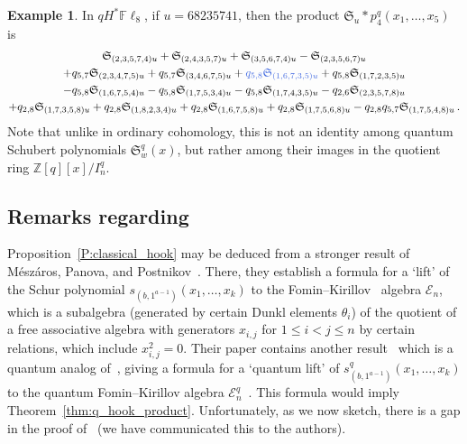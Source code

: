 \documentclass[12pt,oneside,reqno]{amsart}
\theoremstyle{definition}
\newtheorem{example}[theorem]{Example}
\numberwithin{equation}{section}
\newcommand{\Fl}{{\mathbb F}\ell}
\newcommand{\ZZ}{{\mathbb Z}}
\newcommand{\frakS}{{\mathfrak S}}
\newcommand{\defcolor}[1]{{\color{RoyalBlue}#1}}
\begin{document}
\begin{example}\label{Ex:MN_example}
In $qH^*\Fl_8$, if $u=68235741$, then the product $\frakS_{u}\ast p^q_4(x_1,\dotsc,x_5)$ is
\begin{gather*}
      \frakS_{(2,3,5,7,4)u}
    + \frakS_{(2,4,3,5,7)u}
    + \frakS_{(3,5,6,7,4)u}
    - \frakS_{(2,3,5,6,7)u}
    \\
    + q_{5,7}\frakS_{(2,3,4,7,5)u}
    + q_{5,7}\frakS_{(3,4,6,7,5)u}
    + \defcolor{q_{5,8}\frakS_{(1,6,7,3,5)u}}
    + q_{5,8}\frakS_{(1,7,2,3,5)u}
    \\
    - q_{5,8}\frakS_{(1,6,7,5,4)u}
    - q_{5,8}\frakS_{(1,7,5,3,4)u}
    - q_{5,8}\frakS_{(1,7,4,3,5)u}
%
    - q_{2,6}\frakS_{(2,3,5,7,8)u}
    \\
%
    + q_{2,8}\frakS_{(1,7,3,5,8)u}
    + q_{2,8}\frakS_{(1,8,2,3,4)u}
    + q_{2,8}\frakS_{(1,6,7,5,8)u}
    + q_{2,8}\frakS_{(1,7,5,6,8)u}
    -q_{2,8}q_{5,7}\frakS_{(1,7,5,4,8)u} \,.
\end{gather*}
%
Note that unlike in ordinary cohomology, this is not an identity among quantum Schubert polynomials $\frakS^q_w(x)$,
but rather among their images in the quotient ring $\ZZ[q][x]/I^q_n$.
\end{example}

\subsection{Remarks regarding~\cite[Thm.~15]{MPP}}\label{SS:R_MPP}

Proposition~\ref{P:classical_hook} may be deduced from a stronger result of M\'esz\'aros, Panova, and
Postnikov~\cite[Thm.~8]{MPP}.
There, they establish a formula for a `lift' of the Schur polynomial
$s_{(b,1^{a-1})}(x_1,\dotsc,x_k)$ to the Fomin--Kirillov~\cite{FominKirillov}
algebra ${\mathcal E}_n$, which is a subalgebra (generated by certain Dunkl elements $\theta_i$) of the quotient of a free
associative algebra with generators $x_{i,j}$ for $1\leq i<j\leq n$ by certain relations, which include $x_{i,j}^2=0$.
Their paper contains another result~\cite[Thm.~15]{MPP} which is a quantum analog of~\cite[Thm.~8]{MPP}, giving a formula
for a `quantum lift' of $s^q_{(b,1^{a-1})}(x_1,\dotsc,x_k)$ to the quantum Fomin--Kirillov algebra
$\mathcal{E}^q_n$~\cite{Postnikov}.
This formula would imply Theorem~\ref{thm:q_hook_product}.
Unfortunately, as we now sketch, there is a gap in the proof of~\cite[Thm.~15]{MPP} (we have communicated this to the
authors).
\end{document}
